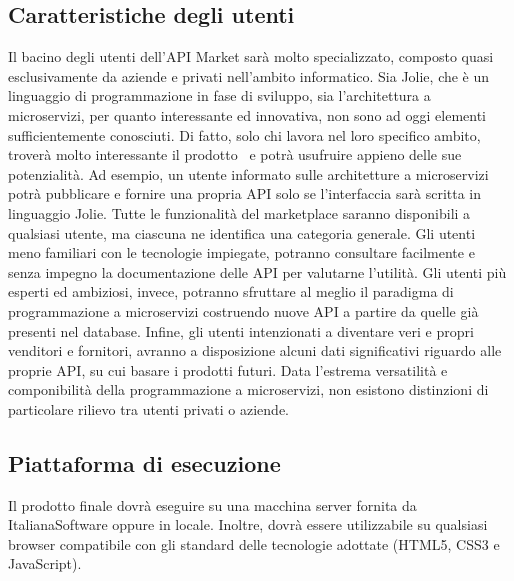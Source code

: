 \subsection{Caratteristiche degli utenti}
Il bacino degli utenti dell'API Market sarà molto specializzato, composto quasi esclusivamente da aziende e privati nell'ambito informatico. Sia Jolie, che è un linguaggio di programmazione in fase di sviluppo, sia l'architettura a microservizi, per quanto interessante ed innovativa, non sono ad oggi elementi sufficientemente conosciuti. Di fatto, solo chi lavora nel loro specifico ambito, troverà molto interessante il prodotto \progetto\ e potrà usufruire appieno delle sue potenzialità. Ad esempio, un utente informato sulle architetture a microservizi potrà pubblicare e fornire una propria API solo se l'interfaccia sarà scritta in linguaggio Jolie. Tutte le funzionalità del marketplace saranno disponibili a qualsiasi utente, ma ciascuna ne identifica una categoria generale. Gli utenti meno familiari con le tecnologie impiegate, potranno consultare facilmente e senza impegno la documentazione delle API per valutarne l'utilità. Gli utenti più esperti ed ambiziosi, invece, potranno sfruttare al meglio il paradigma di programmazione a microservizi costruendo nuove API a partire da quelle già presenti nel database. Infine, gli utenti intenzionati a diventare veri e propri venditori e fornitori, avranno a disposizione alcuni dati significativi riguardo alle proprie API, su cui basare i prodotti futuri. Data l'estrema versatilità e componibilità della programmazione a microservizi, non esistono distinzioni di particolare rilievo tra utenti privati o aziende.

\subsection{Piattaforma di esecuzione}
Il prodotto finale dovrà eseguire su una macchina server fornita da ItalianaSoftware oppure in locale. Inoltre, dovrà essere utilizzabile su qualsiasi browser compatibile con gli standard delle tecnologie adottate (HTML5, CSS3 e JavaScript).

